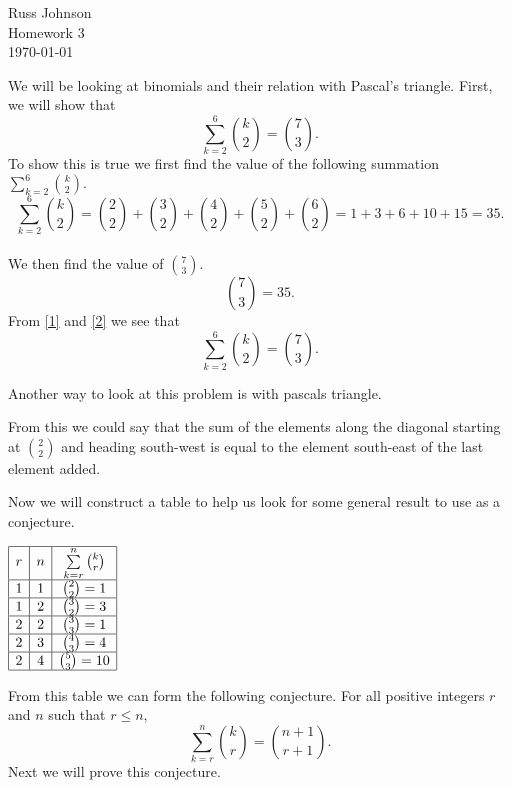 \documentclass[12pt]{article}
\begin{document}
\begin{flushright}
Russ Johnson\\
Homework 3\\
\today\\
\end{flushright}

We will be looking at binomials and their relation with Pascal's triangle.
First, we will show that 
\[\sum\limits_{k=2}^6\binom{k}{2} = \binom{7}{3}.\]
To show this is true we first find the value of the following summation $\sum\limits_{k=2}^6\binom{k}{2}.$
\begin{equation}\label{1}
\sum\limits_{k=2}^6\binom{k}{2} = \binom{2}{2} + \binom{3}{2} + \binom{4}{2} + \binom{5}{2} + \binom{6}{2} = 1+3+6+10+15 = 35.
\end{equation} \\
We then find the value of $\binom{7}{3}.$
\begin{equation}\label{2}
\binom{7}{3} = 35.
\end{equation}
From \eqref{1} and \eqref{2} we see that
\[\sum\limits_{k=2}^6\binom{k}{2} = \binom{7}{3}.\]

Another way to look at this problem is with pascals triangle.
\begin{adjustwidth}{-2cm}{}

\end{adjustwidth}
From this we could say that the sum of the elements along the diagonal starting at $\binom{2}{2}$ and heading south-west is equal to the element south-east of the last element added.

Now we will construct a table to help us look for some general result to use as a conjecture.

\begingroup
\renewcommand*{\arraystretch}{1.5}
\begin{center}
$
\begin{array}{|c|c|c|c|}
\hline
r&n&\sum\limits_{k=r}^n\binom{k}{r}\\\hline
1&1&\binom{2}{2}=1\\\hline
1&2&\binom{3}{2}=3\\\hline
2&2&\binom{3}{3}=1\\\hline
2&3&\binom{4}{3}=4\\\hline
2&4&\binom{5}{3}=10\\\hline
\end{array}
$
\end{center}
\endgroup

From this table we can form the following conjecture. For all positive integers $r$ and $n$ such that $r\leq n$,
\[\sum\limits_{k=r}^{n}\binom{k}{r} = \binom{n+1}{r+1}.\]
Next we will prove this conjecture.
\end{document}
